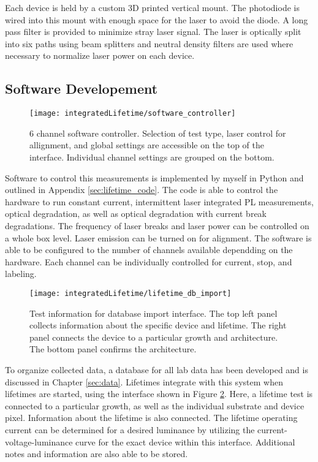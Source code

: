 \documentclass[../thesis.tex]{subfiles}
\begin{document}
Each device is held by a custom 3D printed vertical mount.  
The photodiode is wired into this mount with enough space for the laser to avoid the diode.
A long pass filter is provided to minimize stray laser signal.
The laser is optically split into six paths using beam splitters and neutral density filters are used where necessary to normalize laser power on each device.


\subsection{Software Developement}

\begin{figure}[ht]
    \centering
    \texttt{[image: integratedLifetime/software\_controller]}
\caption{6 channel software controller.  Selection of test type, laser control for allignment, and global settings are accessible on the top of the interface.  Individual channel settings are grouped on the bottom.}
\label{fig:software_controller}
\end{figure}

Software to control this measurements is implemented by myself in Python and outlined in Appendix \ref{sec:lifetime_code}.
The code is able to control the hardware to run constant current, intermittent laser integrated PL measurements, optical degradation, as well as optical degradation with current break degradations.
The frequency of laser breaks and laser power can be controlled on a whole box level.  
Laser emission can be turned on for alignment.
The software is able to be configured to the number of channels available dependding on the hardware.
Each channel can be individually controlled for current, stop, and labeling.  

\begin{figure}[ht]
    \centering
    \texttt{[image: integratedLifetime/lifetime\_db\_import]}
\caption{Test information for database import interface.  The top left panel collects information about the specific device and lifetime.  The right panel connects the device to a particular growth and architecture.  The bottom panel confirms the architecture.}
\label{fig:lifetime_db_import}
\end{figure}

To organize collected data, a database for all lab data has been developed and is discussed in Chapter \ref{sec:data}.
Lifetimes integrate with this system when lifetimes are started, using the interface shown in Figure \ref{fig:lifetime_db_import}.
Here, a lifetime test is connected to a particular growth, as well as the individual substrate and device pixel. 
Information about the lifetime is also connected.  
The lifetime operating current can be determined for a desired luminance by utilizing the current-voltage-luminance curve for the exact device within this interface.  
Additional notes and information are also able to be stored.
\end{document}
